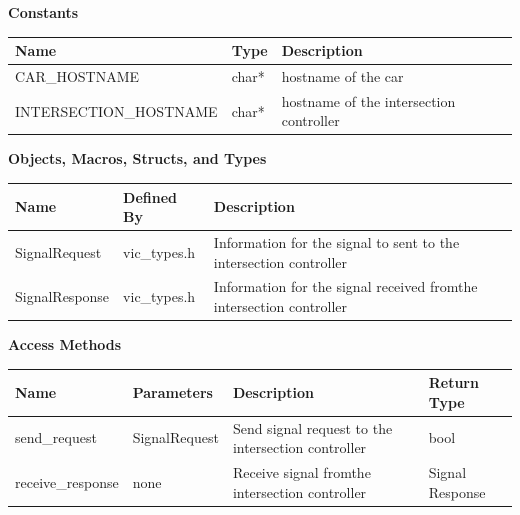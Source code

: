\documentclass [10pt]{article}
\begin{document}
\textbf{Constants}
\begin{longtable}{ p{ }  p{ } p{}} \\ 

\rowcolor{tableCell} \textbf{Name} & \textbf{Type} & \textbf{Description} \\ \hline
\rowcolor{tableCell} CAR\_HOSTNAME & char* & hostname of the car\\ \hline
\rowcolor{tableCell} INTERSECTION\_HOSTNAME & char* & hostname of the intersection controller \\ \hline



\end{longtable}


\textbf{Objects, Macros, Structs, and Types}
\begin{longtable}{ p{ }  p{ } p{}} \\ 

\rowcolor{tableCell} \textbf{Name} & \textbf{Defined By} & \textbf{Description} \\ \hline

\rowcolor{tableCell} SignalRequest & vic\_types.h &  Information for the signal to sent to the intersection controller \\ \hline
\rowcolor{tableCell} SignalResponse & vic\_types.h &  Information for the signal received fromthe intersection controller \\ \hline



\end{longtable}



\textbf{Access Methods} 

\begin{longtable}{ p{ }  p{ } p{} p{}} \\ 

\rowcolor{tableCell} \textbf{Name} & \textbf{Parameters} & \textbf{Description} &\textbf{Return Type} \\ \hline
\rowcolor{tableCell} send\_request & SignalRequest & Send signal request to the intersection controller & bool \\ \hline
\rowcolor{tableCell} receive\_response & none & Receive signal fromthe intersection controller &  Signal Response \\ \hline

\end{longtable}
\end{document}
